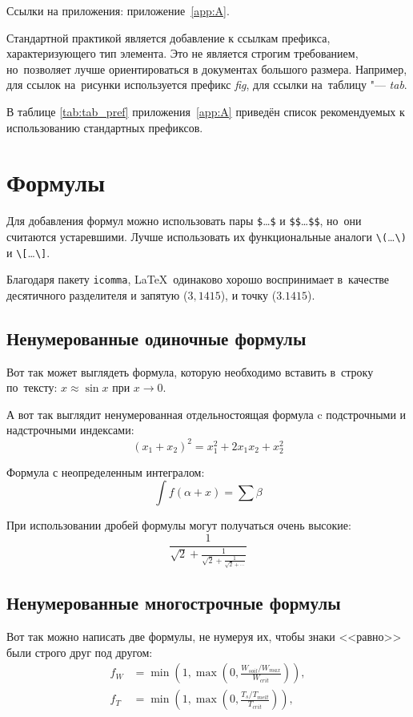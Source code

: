 Ссылки на приложения: приложение~\cref{app:A}.

Стандартной практикой является добавление к ссылкам префикса, характеризующего тип элемента.
Это не является строгим требованием, но~позволяет лучше ориентироваться в документах большого размера.
Например, для ссылок на~рисунки используется префикс \textit{fig}, для ссылки на~таблицу "--- \textit{tab}.

В таблице \cref{tab:tab_pref} приложения~\cref{app:A} приведён список рекомендуемых к использованию стандартных префиксов.

\section{Формулы}\label{sec:ch1/sec3}

Для добавления формул можно использовать пары
\verb+$+\dots\verb+$+ и \verb+$$+\dots\verb+$$+,
но~они считаются устаревшими.
Лучше использовать их функциональные аналоги
\verb+\(+\dots\verb+\)+ и \verb+\[+\dots\verb+\]+.

Благодаря пакету \verb|icomma|, \LaTeX~одинаково хорошо воспринимает
в~качестве десятичного разделителя и запятую (\(3,1415\)), и точку (\(3.1415\)).

\subsection{Ненумерованные одиночные формулы}\label{subsec:ch1/sec3/sub1}

Вот так может выглядеть формула, которую необходимо вставить в~строку
по~тексту: \(x \approx \sin x\) при \(x \to 0\).

А вот так выглядит ненумерованная отдельностоящая формула c подстрочными
и надстрочными индексами:
\[
    (x_1+x_2)^2 = x_1^2 + 2 x_1 x_2 + x_2^2
\]

Формула с неопределенным интегралом:
\[
    \int f(\alpha+x)=\sum\beta
\]

При использовании дробей формулы могут получаться очень высокие:
\[
    \frac{1}{\sqrt{2}+
        \displaystyle\frac{1}{\sqrt{2}+
            \displaystyle\frac{1}{\sqrt{2}+\cdots}}}
\]

\subsection{Ненумерованные многострочные формулы}\label{subsec:ch1/sec3/sub2}

Вот так можно написать две формулы, не нумеруя их, чтобы знаки <<равно>> были
строго друг под другом:
\begin{align}
    f_W & =  \min \left( 1, \max \left( 0, \frac{W_{soil} / W_{max}}{W_{crit}} \right)  \right), \nonumber \\
    f_T & =  \min \left( 1, \max \left( 0, \frac{T_s / T_{melt}}{T_{crit}} \right)  \right), \nonumber
\end{align}

